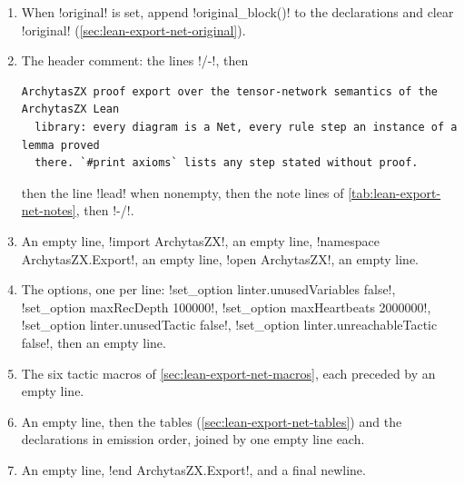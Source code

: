 {\begin{enumerate}
\item When \py!original! is set, append \py!original_block()! to the declarations and clear
  \py!original! (\cref{sec:lean-export-net-original}).
\item The header comment: the lines \code!/-!, then
\begin{lstlisting}[style=grammar]
  ArchytasZX proof export over the tensor-network semantics of the ArchytasZX Lean
  library: every diagram is a Net, every rule step an instance of a lemma proved
  there. `#print axioms` lists any step stated without proof.
\end{lstlisting}
  then the line \py!lead! when nonempty, then the note lines of
  \cref{tab:lean-export-net-notes}, then \code!-/!.
\item An empty line, \code!import ArchytasZX!, an empty line,
  \code!namespace ArchytasZX.Export!, an empty line, \code!open ArchytasZX!, an empty line.
\item The options, one per line: \code!set_option linter.unusedVariables false!,
  \code!set_option maxRecDepth 100000!, \code!set_option maxHeartbeats 2000000!,
  \code!set_option linter.unusedTactic false!, \code!set_option linter.unreachableTactic false!,
  then an empty line.
\item The six tactic macros of \cref{sec:lean-export-net-macros}, each preceded by an empty line.
\item An empty line, then the tables (\cref{sec:lean-export-net-tables}) and the declarations in
  emission order, joined by one empty line each.
\item An empty line, \code!end ArchytasZX.Export!, and a final newline.
\end{enumerate}

}
